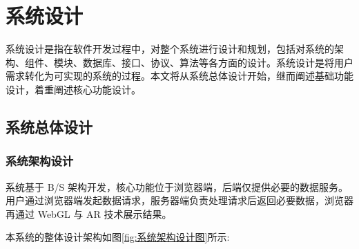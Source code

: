 \section{系统设计}

系统设计是指在软件开发过程中，对整个系统进行设计和规划，包括对系统的架构、组件、模块、数据库、接口、协议、算法等各方面的设计。系统设计是将用户需求转化为可实现的系统的过程。本文将从系统总体设计开始，继而阐述基础功能设计，着重阐述核心功能设计。

\subsection{系统总体设计}

\subsubsection{系统架构设计}

系统基于 B/S 架构开发，核心功能位于浏览器端，后端仅提供必要的数据服务。用户通过浏览器端发起数据请求，服务器端负责处理请求后返回必要数据，浏览器再通过 WebGL 与 AR 技术展示结果\cite{zhang2015remote}。

本系统的整体设计架构如图\ref{fig:系统架构设计图}所示:

